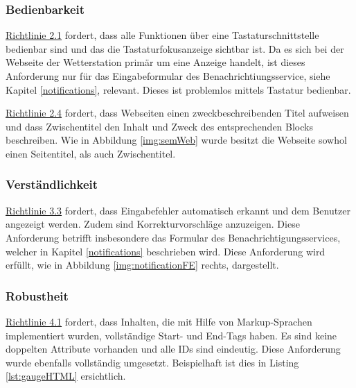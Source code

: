 \subsubsection{Bedienbarkeit}
\href{https://www.w3.org/Translations/WCAG20-de/#keyboard-operation}{Richtlinie 2.1} fordert, dass alle Funktionen über eine Tastaturschnittstelle bedienbar sind und das die Tastaturfokusanzeige sichtbar ist.
Da es sich bei der Webseite der Wetterstation primär um eine Anzeige handelt, ist dieses Anforderung nur für das Eingabeformular des Benachrichtiungsservice, siehe Kapitel \ref{notifications}, relevant. Dieses ist problemlos mittels Tastatur bedienbar. \newline

\noindent
\href{https://www.w3.org/Translations/WCAG20-de/#navigation-mechanisms}{Richtlinie 2.4} fordert, dass Webseiten einen zweckbeschreibenden Titel aufweisen und dass Zwischentitel den Inhalt und Zweck des entsprechenden Blocks beschreiben. Wie in Abbildung \ref{img:semWeb} wurde besitzt die Webseite sowhol einen Seitentitel, als auch Zwischentitel.


\subsubsection{Verständlichkeit}
\href{https://www.w3.org/Translations/WCAG20-de/#minimize-error}{Richtlinie 3.3} fordert, dass Eingabefehler automatisch erkannt und dem Benutzer angezeigt werden. Zudem sind Korrekturvorschläge anzuzeigen. Diese Anforderung betrifft insbesondere das Formular des Benachrichtigungsservices, welcher in Kapitel \ref{notifications} beschrieben wird. Diese Anforderung wird erfüllt, wie in Abbildung \ref{img:notificationFE} rechts, dargestellt.


\subsubsection{Robustheit}
\href{https://www.w3.org/Translations/WCAG20-de/#ensure-compat}{Richtlinie 4.1} fordert, dass Inhalten, die mit Hilfe von Markup-Sprachen implementiert wurden,  vollständige Start- und End-Tags haben. Es sind keine doppelten Attribute vorhanden und alle IDs sind eindeutig. Diese Anforderung wurde ebenfalls vollständig umgesetzt. Beispielhaft ist dies in Listing \ref{lst:gaugeHTML} ersichtlich.

